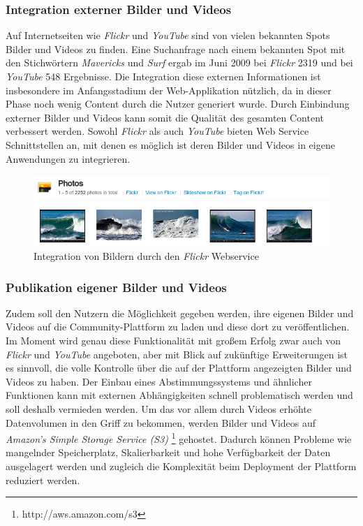 \subsubsection{Integration externer Bilder und Videos}
Auf Internetseiten wie \textit{Flickr} und \textit{YouTube} sind von
vielen bekannten Spots Bilder und Videos zu finden. Eine Suchanfrage
nach einem bekannten Spot mit den Stichwörtern \textit{Mavericks} und
\textit{Surf} ergab im Juni 2009 bei \textit{Flickr} 2319 und bei
\textit{YouTube} 548 Ergebnisse. Die Integration diese externen
Informationen ist insbesondere im Anfangsstadium der Web-Applikation
nützlich, da in dieser Phase noch wenig Content durch die Nutzer
generiert wurde. Durch Einbindung externer Bilder und Videos kann
somit die Qualität des gesamten Content verbessert werden. Sowohl
\textit{Flickr} als auch \textit{YouTube} bieten Web Service
Schnittstellen an, mit denen es möglich ist deren Bilder und Videos in
eigene Anwendungen zu integrieren.

\begin{figure}[h]
 \includegraphics[width=\textwidth]{bilder/photos-flickr}
 \caption{Integration von Bildern durch den \textit{Flickr}
      Webservice}
 \label{photos-flickr}
\end{figure}

\subsubsection{Publikation eigener Bilder und Videos}
Zudem soll den Nutzern die Möglichkeit gegeben werden, ihre eigenen
Bilder und Videos auf die Community-Plattform zu laden und diese dort
zu veröffentlichen. Im Moment wird genau diese Funktionalität mit
großem Erfolg zwar auch von \textit{Flickr} und \textit{YouTube}
angeboten, aber mit Blick auf zukünftige Erweiterungen ist es
sinnvoll, die volle Kontrolle über die auf der Plattform angezeigten
Bilder und Videos zu haben. Der Einbau eines Abstimmungssystems und
ähnlicher Funktionen kann mit externen Abhängigkeiten schnell
problematisch werden und soll deshalb vermieden werden. Um das vor
allem durch Videos erhöhte Datenvolumen in den Griff zu bekommen,
werden Bilder und Videos auf \textit{Amazon's Simple Storage Service
  (S3)} \footnote{http://aws.amazon.com/s3} gehostet. Dadurch können
Probleme wie mangelnder Speicherplatz, Skalierbarkeit und hohe
Verfügbarkeit der Daten ausgelagert werden und zugleich die
Komplexität beim Deployment der Plattform reduziert werden.

